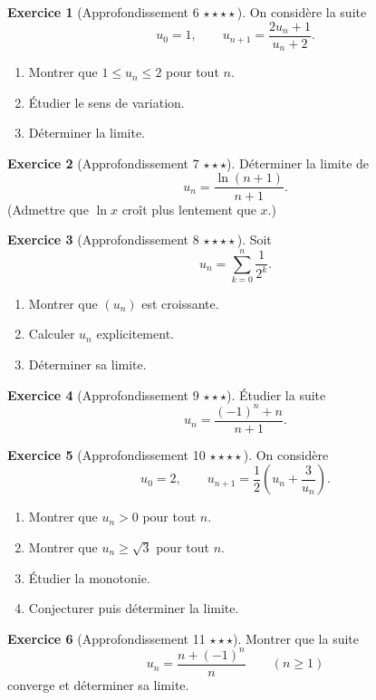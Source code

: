 \documentclass[11pt,a4paper]{article}
\theoremstyle{definition}
\newtheorem{exercice}{Exercice}[section]
\newcommand{\etoile}[1]{\hfill{\small\textbf{#1}}}
\begin{document}
\begin{exercice}[Approfondissement 6 \etoile{$\star\star\star\star$}]
On considère la suite
\[
u_0=1,\qquad u_{n+1}=\frac{2u_n+1}{u_n+2}.
\]
\begin{enumerate}[label=\arabic*.]
    \item Montrer que $1\le u_n\le 2$ pour tout $n$.
    \item Étudier le sens de variation.
    \item Déterminer la limite.
\end{enumerate}
\end{exercice}

\begin{exercice}[Approfondissement 7 \etoile{$\star\star\star$}]
Déterminer la limite de
\[
u_n=\frac{\ln(n+1)}{n+1}.
\]
(Admettre que $\ln x$ croît plus lentement que $x$.)
\end{exercice}

\begin{exercice}[Approfondissement 8 \etoile{$\star\star\star\star$}]
Soit
\[
u_n=\sum_{k=0}^n \frac1{2^k}.
\]
\begin{enumerate}[label=\arabic*.]
    \item Montrer que $(u_n)$ est croissante.
    \item Calculer $u_n$ explicitement.
    \item Déterminer sa limite.
\end{enumerate}
\end{exercice}

\begin{exercice}[Approfondissement 9 \etoile{$\star\star\star$}]
Étudier la suite
\[
u_n=\frac{(-1)^n+n}{n+1}.
\]
\end{exercice}

\begin{exercice}[Approfondissement 10 \etoile{$\star\star\star\star$}]
On considère
\[
u_0=2,\qquad u_{n+1}=\frac12\left(u_n+\frac{3}{u_n}\right).
\]
\begin{enumerate}[label=\arabic*.]
    \item Montrer que $u_n>0$ pour tout $n$.
    \item Montrer que $u_n\ge \sqrt{3}$ pour tout $n$.
    \item Étudier la monotonie.
    \item Conjecturer puis déterminer la limite.
\end{enumerate}
\end{exercice}

\begin{exercice}[Approfondissement 11 \etoile{$\star\star\star$}]
Montrer que la suite
\[
u_n=\frac{n+(-1)^n}{n}
\qquad (n\ge1)
\]
converge et déterminer sa limite.
\end{exercice}
\end{document}

